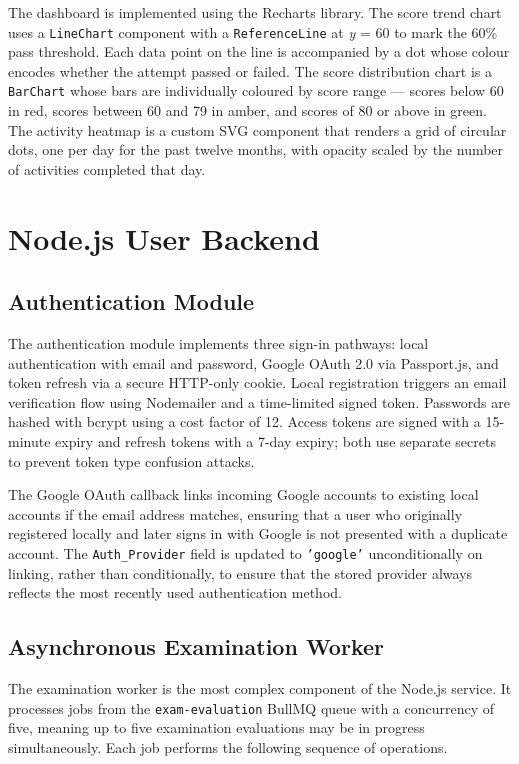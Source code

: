 \documentclass[12pt, a4paper]{report}
\begin{document}
The dashboard is implemented using the Recharts library. The score trend chart uses a \texttt{LineChart} component with a \texttt{ReferenceLine} at \textit{y} = 60 to mark the 60\% pass threshold. Each data point on the line is accompanied by a dot whose colour encodes whether the attempt passed or failed. The score distribution chart is a \texttt{BarChart} whose bars are individually coloured by score range — scores below 60 in red, scores between 60 and 79 in amber, and scores of 80 or above in green. The activity heatmap is a custom SVG component that renders a grid of circular dots, one per day for the past twelve months, with opacity scaled by the number of activities completed that day.

\section{Node.js User Backend}

\subsection{Authentication Module}

The authentication module implements three sign-in pathways: local authentication with email and password, Google OAuth 2.0 via Passport.js, and token refresh via a secure HTTP-only cookie. Local registration triggers an email verification flow using Nodemailer and a time-limited signed token. Passwords are hashed with bcrypt using a cost factor of 12. Access tokens are signed with a 15-minute expiry and refresh tokens with a 7-day expiry; both use separate secrets to prevent token type confusion attacks.

The Google OAuth callback links incoming Google accounts to existing local accounts if the email address matches, ensuring that a user who originally registered locally and later signs in with Google is not presented with a duplicate account. The \texttt{Auth\_Provider} field is updated to \texttt{'google'} unconditionally on linking, rather than conditionally, to ensure that the stored provider always reflects the most recently used authentication method.

\subsection{Asynchronous Examination Worker}

The examination worker is the most complex component of the Node.js service. It processes jobs from the \texttt{exam-evaluation} BullMQ queue with a concurrency of five, meaning up to five examination evaluations may be in progress simultaneously. Each job performs the following sequence of operations.
\end{document}
